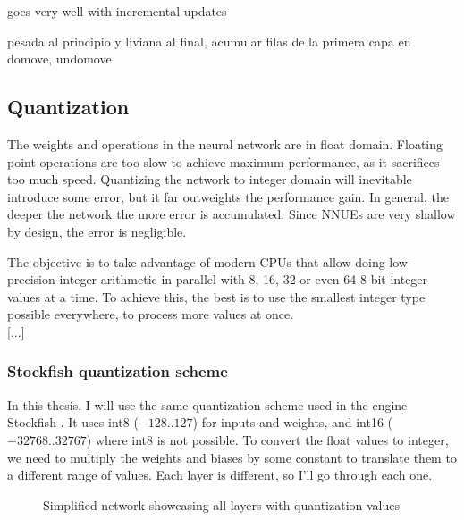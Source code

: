 goes very well with incremental updates

pesada al principio y liviana al final, acumular filas de la primera capa en domove, undomove

\subsection{Quantization}


The weights and operations in the neural network are in float domain. Floating point operations are too slow to achieve maximum performance, as it sacrifices too much speed. Quantizing the network to integer domain will inevitable introduce some error, but it far outweights the performance gain. In general, the deeper the network the more error is accumulated. Since NNUEs are very shallow by design, the error is negligible.

The objective is to take advantage of modern CPUs that allow doing low-precision integer arithmetic in parallel with 8, 16, 32 or even 64 8-bit integer values at a time. To achieve this, the best is to use the smallest integer type possible everywhere, to process more values at once. \\

[...]

\subsubsection{Stockfish quantization scheme}

In this thesis, I will use the same quantization scheme used in the engine Stockfish \cite{nnue-pytorch}. It uses int8 ($-128..127$) for inputs and weights, and int16 ($-32768..32767$) where int8 is not possible.
To convert the float values to integer, we need to multiply the weights and biases by some constant to translate them to a different range of values. Each layer is different, so I'll go through each one.

\begin{figure}[H]
\centering
{}
\caption{Simplified network showcasing all layers with quantization values}
\label{fig:quantization}
\end{figure}

